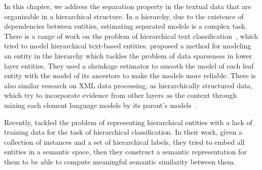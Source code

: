 In this chapter, we address the separation property in the textual data that are organizable in a hierarchical structure. In a hierarchy, due to the existence of dependencies between entities, estimating separated models is a complex task. There is a range of work on the problem of hierarchical text classification~\citep{Sebastiani:2002, Sun:2001}, which tried to model hierarchical text-based entities. \citet{McCallum:1998} proposed a method for modeling an entity in the hierarchy which tackles the problem of data sparseness in lower layer entities. They used a shrinkage estimator to smooth the model of each leaf entity with the model of its ancestors to make the models more reliable. 
There is also similar research on XML data processing, as hierarchically structured data, which try to incorporate evidence from other layers as the context through mixing each element language models by its parent's models~\citep{sigurbjornsson:2004,ogilvie:2004}.
%

Recently, \citet{Song:2014} tackled the problem of representing hierarchical entities with a lack of training data for the task of hierarchical classification.  In their work, given a collection of instances and a set of hierarchical labels, they tried to embed all entities in a semantic space, then they construct a semantic representation for them to be able to compute meaningful semantic similarity between them.
%

